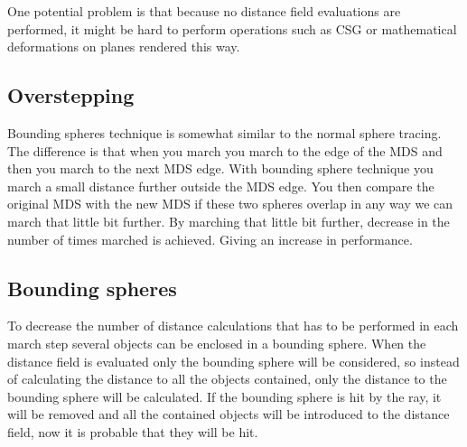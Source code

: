 			One potential problem is that because no distance field evaluations 
			are performed, it might be hard to perform operations such as CSG or
			mathematical deformations on planes rendered this way.

		\subsection{Overstepping}

			Bounding spheres technique is somewhat similar to the normal sphere
			tracing. The difference is that when you march you march to the
			edge of the MDS and then you march to the next MDS edge. With
			bounding sphere technique you march a small distance further
			outside the MDS edge. You then compare the original MDS with the
			new MDS if these two spheres overlap in any way we can march that
			little bit further. By marching that little bit further, decrease
			in the number of times marched is achieved. Giving an increase in
			performance. 

		\subsection{Bounding spheres}
			
			To decrease the number of distance calculations that has to be 
			performed in each march step several objects can be enclosed in a 
			bounding sphere. When the distance field is evaluated only the 
			bounding sphere will be considered, so instead of calculating the 
			distance to all the objects contained, only the distance to the 
			bounding sphere will be calculated. If the bounding sphere is hit
			by the ray, it will be removed and all the contained objects will 
			be introduced to the distance field, now it is probable that they
			will be hit.
		
			

